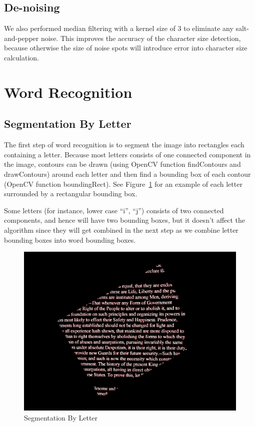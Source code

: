\documentclass[conference]{IEEEtran}
\begin{document}
\subsection{De-noising}
We also performed median filtering with a kernel size of 3 to eliminate any salt-and-pepper noise.  This improves the accuracy of the character size detection, because otherwise the size of noise spots will introduce error into character size calculation.

\section{Word Recognition}

\subsection{Segmentation By Letter}
The first step of word recognition is to segment the image into rectangles each containing a letter.  Because most letters consists of one connected component in the image, contours can be drawn (using OpenCV function findContours and drawContours) around each letter and then find a bounding box of each contour (OpenCV function boundingRect). See Figure~\ref{letterbbox} for an example of each letter surrounded by a rectangular bounding box.

Some letters (for instance, lower case ``i'', ``j'') consists of two connected components, and hence will have two bounding boxes, but it doesn't affect the algorithm since they will get combined in the next step as we combine letter bounding boxes into word bounding boxes.

\begin{figure}
\center
\includegraphics[scale=0.10]{letter_with_bounding_box.jpg}
\caption{Segmentation By Letter}
\label{letterbbox}
\end{figure}
\end{document}
